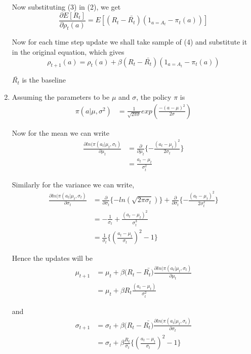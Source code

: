 \documentclass[a4paper,english]{article}
\begin{document}
\begin{enumerate}
Now substituting (3) in (2), we get
\begin{equation}
\frac{\partial E[R_{t}]}{\partial\rho_{t}(a)}=E[(R_{t}-\bar{R_{t}})(1_{a=A_{t}}-\pi_{t}(a))]\label{eq-1}
\end{equation}

Now for each time step update we shall take sample of (4) and substitute
it in the original equation, which gives
\[
\rho_{t+1}(a)=\rho_{t}(a)+\beta(R_{t}-\bar{R_{t}})(1_{a=A_{t}}-\pi_{t}(a))
\]

$\bar{R_{t}}$ is the baseline
\item Assuming the parameters to be $\mu$ and $\sigma$, the policy $\pi$
is
\begin{align}
\pi(a|\mu,\sigma^{2}) & =\frac{1}{\sqrt{2\pi\sigma}}exp(\frac{-(a-\mu)^{2}}{2\sigma})\label{Sampled from the normal distribution}
\end{align}

Now for the mean we can write
\begin{align*}
\frac{\partial ln(\pi(a_{t}|\mu_{t},\sigma_{t})}{\partial\mu_{t}} & =\frac{\partial}{\partial\mu_{t}}\{-\frac{(a_{t}-\mu_{t})^{2}}{2\sigma_{t}}\}\\
 & =\frac{a_{t}-\mu_{t}}{\sigma_{t}^{2}}
\end{align*}

Similarly for the variance we can write,
\begin{align*}
\frac{\partial ln(\pi(a_{t}|\mu_{t},\sigma_{t})}{\partial\sigma_{t}} & =\frac{\partial}{\partial\sigma_{t}}\{-ln(\sqrt{2\pi\sigma_{t}})\}+\frac{\partial}{\partial\sigma_{t}}\{-\frac{(a_{t}-\mu_{t})^{2}}{2\sigma_{t}^{2}}\}\\
 & =-\frac{1}{\sigma_{t}}+\frac{(a_{t}-\mu_{t})^{2}}{\sigma_{t}^{3}}\\
 & =\frac{1}{\sigma_{t}}\{(\frac{a_{t}-\mu_{t}}{\sigma_{t}})^{2}-1\}
\end{align*}

Hence the updates will be
\begin{align}
\mu_{t+1} & =\mu_{t}+\beta(R_{t}-\bar{R_{t})}\frac{\partial ln(\pi(a_{t}|\mu_{t},\sigma_{t})}{\partial\mu_{t}}\nonumber \\
 & =\mu_{t}+\beta R_{t}\frac{(a_{t}-\mu_{t})}{\sigma_{t}^{2}}\label{baseline is 0}
\end{align}

and
\begin{align*}
\sigma_{t+1} & =\sigma_{t}+\beta(R_{t}-\bar{R_{t})}\frac{\partial ln(\pi(a_{t}|\mu_{t},\sigma_{t})}{\partial\sigma_{t}}\\
 & =\sigma_{t}+\beta\frac{R_{t}}{\sigma_{t}}\{(\frac{a_{t}-\mu_{t}}{\sigma_{t}})^{2}-1\}
\end{align*}
\end{enumerate}
\end{document}
